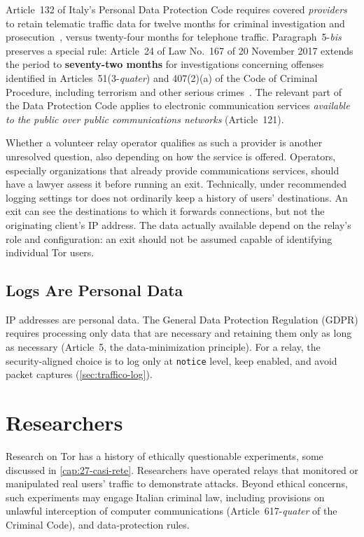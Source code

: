 Article~132 of Italy's Personal Data Protection Code requires covered \emph{providers} to retain telematic traffic data for twelve months for criminal investigation and prosecution~\cite{codiceprivacy}, versus twenty-four months for telephone traffic. Paragraph~5-\emph{bis} preserves a special rule: Article~24 of Law No.~167 of 20 November 2017 extends the period to \textbf{seventy-two months} for investigations concerning offenses identified in Articles~51(3-\emph{quater}) and 407(2)(a) of the Code of Criminal Procedure, including terrorism and other serious crimes~\cite{legge167}. The relevant part of the Data Protection Code applies to electronic communication services \emph{available to the public over public communications networks} (Article~121).

Whether a volunteer relay operator qualifies as such a provider is another unresolved question, also depending on how the service is offered. Operators, especially organizations that already provide communications services, should have a lawyer assess it before running an exit. Technically, under recommended logging settings tor does not ordinarily keep a history of users' destinations. An exit can see the destinations to which it forwards connections, but not the originating client's IP address. The data actually available depend on the relay's role and configuration: an exit should not be assumed capable of identifying individual Tor users.

\subsection{Logs Are Personal Data}

IP addresses are personal data. The General Data Protection Regulation (GDPR) requires processing only data that are necessary and retaining them only as long as necessary (Article~5, the data-minimization principle). For a relay, the security-aligned choice is to log only at \texttt{notice} level, keep  enabled, and avoid packet captures (\cref{sec:traffico-log}).

\section{Researchers}\label{sec:legale-ricerca}

Research on Tor has a history of ethically questionable experiments, some discussed in \cref{cap:27-casi-rete}. Researchers have operated relays that monitored or manipulated real users' traffic to demonstrate attacks. Beyond ethical concerns, such experiments may engage Italian criminal law, including provisions on unlawful interception of computer communications (Article~617-\emph{quater} of the Criminal Code), and data-protection rules.

